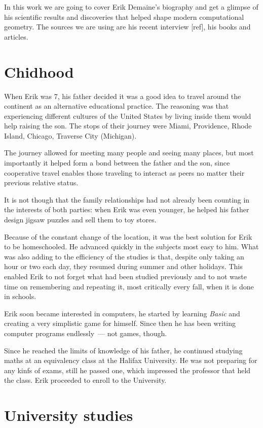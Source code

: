\documentclass[a4paper,12pt]{article}
\begin{document}
In this work we are going to cover Erik Demaine's biography and get a glimpse of his scientific results and discoveries that helped shape modern computational geometry. The sources we are using are his recent interview [ref], his books and articles.

\section{Chidhood}

When Erik was 7, his father decided it was a good idea to travel around the continent as an alternative educational practice. The reasoning was that experiencing different cultures of the United States by living inside them would help raising the son. The stops of their journey were Miami, Providence, Rhode Island, Chicago, Traverse City (Michigan).

The journey allowed for meeting many people and seeing many places, but most importantly it helped form a bond between the father and the son, since cooperative travel enables those traveling to interact as peers no matter their previous relative status.

It is not though that the family relationships had not already been counting in the interests of both parties: when Erik was even younger, he helped his father design jigsaw puzzles and sell them to toy stores.

Because of the constant change of the location, it was the best solution for Erik to be homeschooled. He advanced quickly in the subjects most easy to him. What was also adding to the efficiency of the studies is that, despite only taking an hour or two each day, they resumed during summer and other holidays. This enabled Erik to not forget what had been studied previously and to not waste time on remembering and repeating it, most critically every fall, when it is done in schools.

Erik soon became interested in computers, he started by learning {\it Basic} and creating a very simplistic game for himself. Since then he has been writing computer programs endlessly~— not games, though.

Since he reached the limits of knowledge of his father, he continued studying maths at an equivalency class at the Halifax University. He was not preparing for any kinfs of exams, still he passed one, which impressed the professor that held the class. Erik proceeded to enroll to the University.

\section{University studies}
\end{document}
